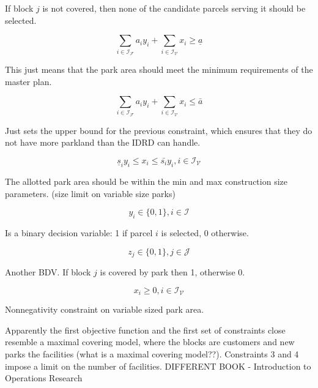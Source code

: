 \documentclass{article}
\begin{document}
If block $j$ is not covered, then none of the candidate parcels serving it should be selected.

\begin{equation}
\sum_{i \in \mathcal{I_F}} a_iy_i + \sum_{i \in \mathcal{I_V}} x_i  \geq \underline{a}
\end{equation}

This just means that the park area should meet the minimum requirements of the master plan.

\begin{equation}
\sum_{i \in \mathcal{I_F}} a_iy_i + \sum_{i \in \mathcal{I_V}} x_i  \leq \bar{a}
\end{equation}

Just sets the upper bound for the previous constraint, which ensures that they do not have more parkland than the IDRD can handle.

\begin{equation}
\underline{s}_iy_i \leq x_i \leq \bar{s_i}y_i, i \in \mathcal{I_V}
\end{equation}

The allotted park area should be within the min and max construction size parameters. (size limit on variable size parks)

\begin{equation}
y_i \in \{0,1\}, i \in \mathcal{I}
\end{equation}

Is a binary decision variable: 1 if parcel $i$ is selected, 0 otherwise.

\begin{equation}
z_j \in \{0,1\}, j \in \mathcal{J}
\end{equation}

Another BDV. If block $j$ is covered by park then 1, otherwise 0.

\begin{equation}
x_i \geq 0, i \in \mathcal{I_V}
\end{equation}

Nonnegativity constraint on variable sized park area. \newline \newline


Apparently the first objective function and the first set of constraints close resemble a maximal covering model, where the blocks are customers and new parks the facilities (what is a maximal covering model??). Constraints 3 and 4 impose a limit on the number of facilities.
%
%
%
%
%
%
\newpage
{\LARGE DIFFERENT BOOK - Introduction to Operations Research}
\setcounter{section}{0}
\end{document}
